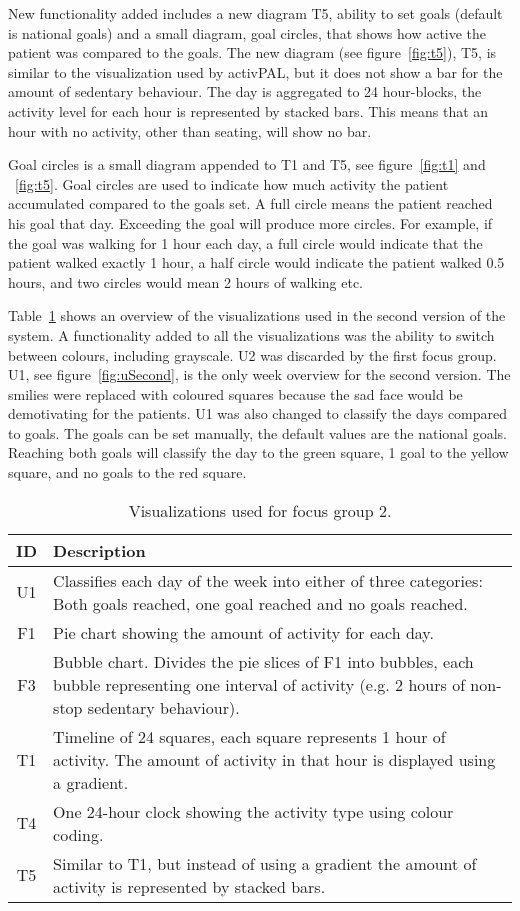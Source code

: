 New functionality added includes a new diagram T5, ability to set goals (default is national goals) and a small diagram, goal circles, that shows how active the patient was compared to the goals. The new diagram (see figure~\ref{fig:t5}), T5, is similar to the visualization used by activPAL, but it does not show a bar for the amount of sedentary behaviour. The day is aggregated to 24 hour-blocks, the activity level for each hour is represented by stacked bars. This means that an hour with no activity, other than seating, will show no bar. 

Goal circles is a small diagram appended to T1 and T5, see figure~\ref{fig:t1} and ~\ref{fig:t5}. Goal circles are used to indicate how much activity the patient accumulated compared to the goals set. A full circle means the patient reached his goal that day. Exceeding the goal will produce more circles. For example, if the goal was walking for 1 hour each day, a full circle would indicate that the patient walked exactly 1 hour, a half circle would indicate the patient walked 0.5 hours, and two circles would mean 2 hours of walking etc.

Table~\ref{tab:runProtDesc2} shows an overview of the visualizations used in the second version of the system. A functionality added to all the visualizations was the ability to switch between colours, including grayscale. U2 was discarded by the first focus group. U1, see figure~\ref{fig:uSecond}, is the only week overview for the second version. The smilies were replaced with coloured squares because the sad face would be demotivating for the patients. U1 was also changed to classify the days compared to goals. The goals can be set manually, the default values are the national goals. Reaching both goals will classify the day to the green square, 1 goal to the yellow square, and no goals to the red square.

\begin{table}[h!]
  \centering
  \begin{tabular}{|c|p{11cm}|}
    \hline
    \textbf{ID} & \textbf{Description} \\ \hline
    U1 & Classifies each day of the week into either of three categories: Both goals reached, one goal reached and no goals reached. \\ \hline
    F1 & Pie chart showing the amount of activity for each day. \\ \hline
    F3 & Bubble chart. Divides the pie slices of F1 into bubbles, each bubble representing one interval of activity (e.g. 2 hours of non-stop sedentary behaviour). \\ \hline
    T1 & Timeline of 24 squares, each square represents 1 hour of activity. The amount of activity in that hour is displayed using a gradient. \\ \hline
    T4 & One 24-hour clock showing the activity type using colour coding. \\ \hline
    T5 & Similar to T1, but instead of using a gradient the amount of activity is represented by stacked bars. \\ \hline
  \end{tabular}
  \caption{Visualizations used for focus group 2.}
  \label{tab:runProtDesc2}
\end{table}

